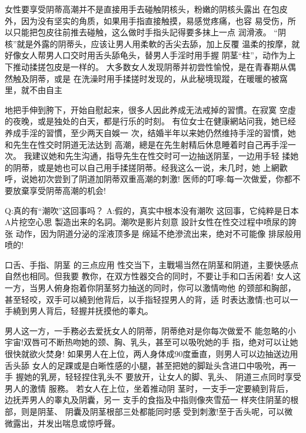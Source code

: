 \documentclass[12pt,UTF8]{ctexbook}
\begin{document}
女性要享受阴蒂高潮并不是直接用手去碰触阴核头，粉嫩的阴核头露出
在包皮外，因为没有坚实的角质，如果用手指直接触摸，易感觉疼痛，也容
易受伤，所以只能把包皮往前推去碰触，这么做时手指头記得要多抹上一点
润滑液。
“阴核”就是外露的阴蒂头，应该让男人用柔軟的舌尖去舔，加上反覆
温柔的按摩，就好像女人帮男人口交时用舌头舔龟头，替男人手淫时用手握
阴茎“柱”，动作为上下推动揉搓包皮是一样的。
大多数女人发现阴蒂并初尝性愉悅，是在青春期从偶然触及阴蒂，或是
在洗澡时用手揉搓时发现的，从此秘境现蹤，在暖暖的被窩里，就不由自主

地把手伸到胯下，开始自慰起来，很多人因此养成无法戒掉的習慣。在寂寞
空虛的夜晚，或是独处的白天，都是行乐的时刻。
有位女士在健康網站问我，她已经养成手淫的習慣，至少两天自娛一
次，结婚半年以来她仍然维持手淫的習慣，她和先生在性交时阴道无法达到
高潮，總是在先生射精后休息睡着时自己再手淫一次。
我建议她和先生沟通，指导先生在性交时可一边抽送阴茎，一边用手轻
揉她的阴蒂，或是她也可以自己用手揉搓阴蒂。经我这么一说，未几时，她
上網歡呼，说她初次尝到了阴道加阴蒂双重高潮的刺激!
医师的叮嚀:每一次做爱，你都不要放棄享受阴蒂高潮的机会!

Q:真的有“潮吹”这回事吗？
A:假的，真实中根本没有潮吹
这回事，它纯粹是日本A片挖空心思
製造出来的名詞。潮吹是影片刻意
設計女性在性交过程中喷尿的誇张
动作，因为阴道分泌的淫液顶多是
绵延不绝滲流出来，绝对不可能像
排尿般用喷的!

口舌、手指、阴茎
的三点应用
性交当下，主戰場当然在阴茎和阴道，主要快感点自然也相同。但我要
教你，在双方性器交合的同时，不要让手和口舌闲着!
女人这一方，当男人俯身抱着你阴茎努力抽送的同时，你可以激情吻他
的颈部和胸部，甚至轻咬，双手可以繞到他背后，以手指轻捏男人的背，适
时表达激情;也可以一手繞到男人背后，轻握并抚摸他的睾丸。

男人这一方，一手務必去爱抚女人的阴蒂，阴蒂绝对是你每次做爱不
能忽略的小宇宙!双唇可不断热吻她的颈、胸、乳头，甚至可以吸吮她的手
指，绝对可以让她很快就欲火焚身!
如果男人在上位，两人身体成90度垂直，则男人可以边抽送边用舌头舔
女人的足踝或是白晰性感的小腿，甚至把她的脚趾头含进口中吸吮，再一手
握她的乳房，轻轻捏住乳头不
要放开，让女人的脚、乳头、
阴道三点同时享受男人的激情
服務。
若女人在上位，坐着推动阴
茎时，一支手一定要繞到背后，
边抚弄男人的睾丸及阴囊，另一
支手的食指及中指则像夾雪茄一
样夾住阴茎的根部，则是阴茎、
阴囊及阴茎根部三处都能同时感
受到刺激!至于舌头呢，可以微
微露出，并发出喘息或惊呼聲。
\end{document}
